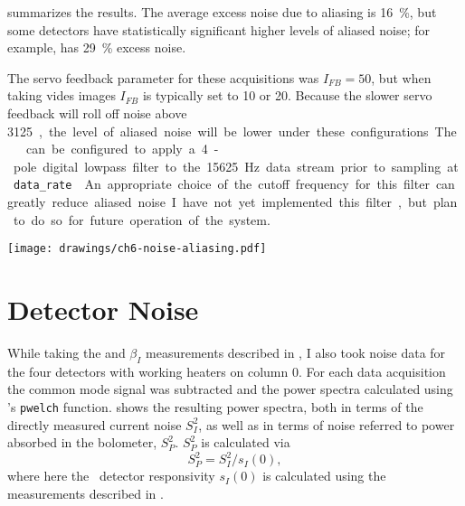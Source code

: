  summarizes the results.
The average excess noise due to aliasing is \SI{16}{\percent}, but some detectors have statistically significant higher levels of aliased noise; for example,  has \SI{29}{\percent} excess noise.

The servo feedback parameter for these acquisitions was $I_{FB} = 50$, but when taking vides images $I_{FB}$ is typically set to 10 or 20.
Because the slower servo feedback will roll off noise above \SI{3125}, the level of aliased noise will be lower under these configurations.

The \MCE\ can be configured to apply a 4-pole digital lowpass filter to the \SI{15625}{\Hz} data stream prior to sampling at \texttt{data\_rate} \cite{mce_team_digital_????}.
An appropriate choice of the cutoff frequency for this filter can greatly reduce aliased noise.
I have not yet implemented this filter, but plan to do so for future operation of the system.

\begin{figure*}
  \centering
\texttt{[image: drawings/ch6-noise-aliasing.pdf]}
\caption[Plots showing impact of noise aliasing]{
Plots showing impact of noise aliasing.
\textbf{Left}
Plot showing fractional excess noise (see text for definition) due to noise aliasing for all rows of column 0.
The error bars are for \SI{95}{\percent} confidence intervals, and the median excess noise is \SI{12}{\percent}.
\textbf{Right}
Sample power spectra at \SI{3125}{\hertz} and \SI{15625}{\hertz} for .
For this detector the excess noise is \SI{17}{\percent}.
}
\label{fig:ch6-noise-aliasing}
\end{figure*}

\section{Detector Noise} \label{sec:det-noise}

While taking the \Loop and $\beta_I$ measurements described in , I also took noise data for the four detectors with working heaters on column 0.
For each data acquisition the common mode signal was subtracted and the power spectra calculated using \MATLAB's \texttt{pwelch} function.
 shows the resulting power spectra, both in terms of the directly measured current noise $S^2_I$, as well as in terms of noise referred to power absorbed in the bolometer, $S^2_{P}$.
$S^2_{P}$ is calculated via
\begin{equation}
 S^2_{P} = S^2_I / s_I(0),
\end{equation}
where here the \DC\ detector responsivity $s_I(0)$ is calculated using the measurements described in .

